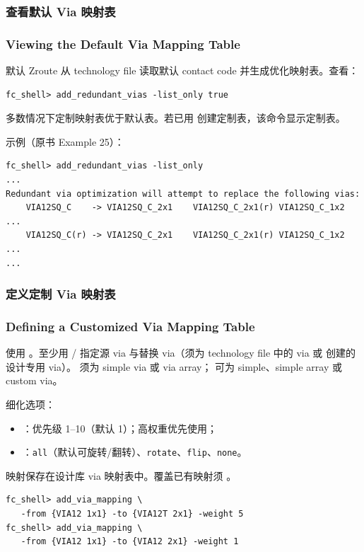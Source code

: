 \subsubsection{查看默认 Via 映射表}
\subsubsection*{Viewing the Default Via Mapping Table}

默认 Zroute 从 technology file 读取默认 contact code 并生成优化映射表。查看：
\begin{lstlisting}
fc_shell> add_redundant_vias -list_only true
\end{lstlisting}
多数情况下定制映射表优于默认表。若已用  创建定制表，该命令显示定制表。

示例（原书 Example 25）：
\begin{lstlisting}
fc_shell> add_redundant_vias -list_only
...
Redundant via optimization will attempt to replace the following vias:
    VIA12SQ_C    -> VIA12SQ_C_2x1    VIA12SQ_C_2x1(r) VIA12SQ_C_1x2 ...
    VIA12SQ_C(r) -> VIA12SQ_C_2x1    VIA12SQ_C_2x1(r) VIA12SQ_C_1x2 ...
...
\end{lstlisting}

\subsubsection{定义定制 Via 映射表}
\subsubsection*{Defining a Customized Via Mapping Table}

使用 。至少用 / 指定源 via 与替换 via（须为 technology file 中的 via 或  创建的设计专用 via）。 须为 simple via 或 via array； 可为 simple、simple array 或 custom via。

细化选项：
\begin{itemize}
  \item {}：优先级 1--10（默认 1）；高权重优先使用；
  \item {}：\texttt{all}（默认可旋转/翻转）、\texttt{rotate}、\texttt{flip}、\texttt{none}。
\end{itemize}

映射保存在设计库 via 映射表中。覆盖已有映射须 。

\begin{lstlisting}
fc_shell> add_via_mapping \
   -from {VIA12 1x1} -to {VIA12T 2x1} -weight 5
fc_shell> add_via_mapping \
   -from {VIA12 1x1} -to {VIA12 2x1} -weight 1
\end{lstlisting}

